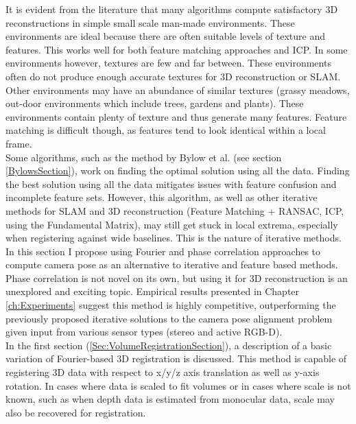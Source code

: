 
It is evident from the literature that many algorithms compute satisfactory 3D reconstructions in simple small scale man-made environments. These environments are ideal because there are often suitable levels of texture and features. This works well for both feature matching approaches and ICP. In some environments however, textures are few and far between. These environments often do not produce enough accurate textures for 3D reconstruction or SLAM. \\

Other environments may have an abundance of similar textures (grassy meadows, out-door environments which include trees, gardens and plants). These environments contain plenty of texture and thus generate many features. Feature matching is difficult though, as features tend to look identical within a local frame. \\

Some algorithms, such as the method by Bylow et al. (see section \ref{BylowsSection}), work on finding the optimal solution using all the data. Finding the best solution using all the data mitigates issues with feature confusion and incomplete feature sets. However, this algorithm, as well as other iterative methods for SLAM and 3D reconstruction (Feature Matching + RANSAC, ICP, using the Fundamental Matrix), may still get stuck in local extrema, especially when registering against wide baselines. This is the nature of iterative methods. \\

In this section I propose using Fourier and phase correlation approaches to compute camera pose as an alternative to iterative and feature based methods. Phase correlation is not novel on its own, but using it for 3D reconstruction is an unexplored and exciting topic. Empirical results presented in Chapter \ref{ch:Experiments} suggest this method is highly competitive, outperforming the previously proposed iterative solutions to the camera pose alignment problem given input from various sensor types (stereo and active RGB-D). \\

In the first section (\ref{Sec:VolumeRegistrationSection}), a description of a basic variation of Fourier-based 3D registration is discussed. This method is capable of registering 3D data with respect to x/y/z axis translation as well as y-axis rotation. In cases where data is scaled to fit volumes or in cases where scale is not known, such as when depth data is estimated from monocular data, scale may also be recovered for registration. \\

